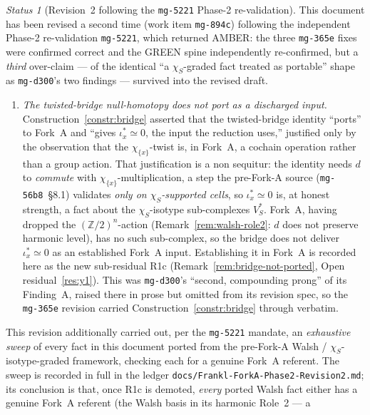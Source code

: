 \documentclass[11pt,oneside]{amsart}
\theoremstyle{plain}
\theoremstyle{definition}
\theoremstyle{remark}
\theoremstyle{honeststyle}
\newtheorem{status}[theorem]{Status}
\newcommand{\Z}{\mathbb{Z}}
\newcommand{\walsh}[1]{\chi_{#1}}
\begin{document}
\begin{status}[Revision~2 following the \texttt{mg-5221} Phase-2
re-validation]
\label{status:mg894c-revision}
This document has been revised a second time (work item
\texttt{mg-894c}) following the independent Phase-2 re-validation
\texttt{mg-5221}, which returned \textsf{AMBER}: the three
\texttt{mg-365e} fixes were confirmed correct and the GREEN spine
independently re-confirmed, but a \emph{third} over-claim --- of the
identical ``a $\walsh{S}$-graded fact treated as portable'' shape as
\texttt{mg-d300}'s two findings --- survived into the revised draft.
\begin{enumerate}[label=\textup{(\Alph*)},leftmargin=2.4em]
\item \emph{The twisted-bridge null-homotopy does not port as a
  discharged input.} Construction~\ref{constr:bridge} asserted that
  the twisted-bridge identity ``ports'' to Fork~A and ``gives
  $\iota_x^{*}\simeq0$, the input the reduction uses,'' justified only
  by the observation that the $\walsh{\{x\}}$-twist is, in Fork~A, a
  cochain operation rather than a group action. That justification is
  a non sequitur: the identity needs $d$ to \emph{commute} with
  $\walsh{\{x\}}$-multiplication, a step the pre-Fork-A source
  (\texttt{mg-56b8}~\S8.1) validates \emph{only on
  $\walsh{S}$-supported cells}, so $\iota_x^{*}\simeq0$ is, at honest
  strength, a fact about the $\walsh{S}$-isotype sub-complexes
  $V_S^{*}$. Fork~A, having dropped the $(\Z/2)^n$-action
  (Remark~\ref{rem:walsh-role2}: $d$ does not preserve harmonic
  level), has no such sub-complex, so the bridge does not deliver
  $\iota_x^{*}\simeq0$ as an established Fork~A input. Establishing it
  in Fork~A is recorded here as the new sub-residual R1c
  (Remark~\ref{rem:bridge-not-ported}, Open residual~\ref{res:y1}).
  This was \texttt{mg-d300}'s ``second, compounding prong'' of its
  Finding~A, raised there in prose but omitted from its revision
  spec, so the \texttt{mg-365e} revision carried
  Construction~\ref{constr:bridge} through verbatim.
\end{enumerate}
This revision additionally carried out, per the \texttt{mg-5221}
mandate, an \emph{exhaustive sweep} of every fact in this document
ported from the pre-Fork-A Walsh / $\walsh{S}$-isotype-graded
framework, checking each for a genuine Fork~A referent. The sweep is
recorded in full in the ledger
\texttt{docs/Frankl-ForkA-Phase2-Revision2.md}; its conclusion is
that, once R1c is demoted, \emph{every} ported Walsh fact either has a
genuine Fork~A referent (the Walsh basis in its harmonic Role~2 --- a

\end{status}
\end{document}
